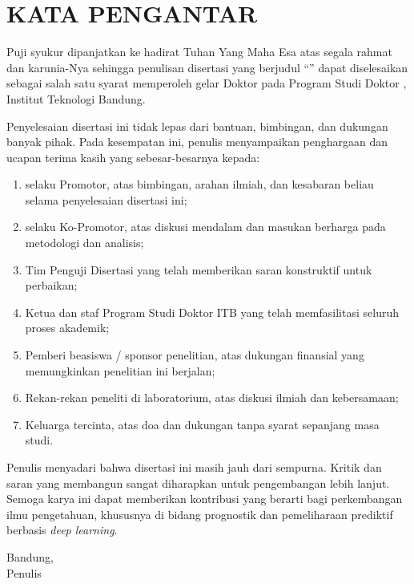 
\chapter*{KATA PENGANTAR}

Puji syukur dipanjatkan ke hadirat Tuhan Yang Maha Esa atas segala
rahmat dan karunia-Nya sehingga penulisan disertasi yang berjudul
``\textbf{\@title}'' dapat diselesaikan sebagai salah satu syarat
memperoleh gelar Doktor pada Program Studi Doktor \@prodi, Institut
Teknologi Bandung.

Penyelesaian disertasi ini tidak lepas dari bantuan, bimbingan, dan
dukungan banyak pihak. Pada kesempatan ini, penulis menyampaikan
penghargaan dan ucapan terima kasih yang sebesar-besarnya kepada:

\begin{enumerate}
  \item \@promotor{} selaku Promotor, atas bimbingan, arahan ilmiah,
        dan kesabaran beliau selama penyelesaian disertasi ini;
  \item \@kopromotor{} selaku Ko-Promotor, atas diskusi mendalam dan
        masukan berharga pada metodologi dan analisis;
  \item Tim Penguji Disertasi yang telah memberikan saran konstruktif
        untuk perbaikan;
  \item Ketua dan staf Program Studi Doktor \@prodi{} ITB yang telah
        memfasilitasi seluruh proses akademik;
  \item Pemberi beasiswa / sponsor penelitian, atas dukungan finansial
        yang memungkinkan penelitian ini berjalan;
  \item Rekan-rekan peneliti di laboratorium, atas diskusi ilmiah dan
        kebersamaan;
  \item Keluarga tercinta, atas doa dan dukungan tanpa syarat sepanjang
        masa studi.
\end{enumerate}

Penulis menyadari bahwa disertasi ini masih jauh dari sempurna. Kritik
dan saran yang membangun sangat diharapkan untuk pengembangan lebih
lanjut. Semoga karya ini dapat memberikan kontribusi yang berarti bagi
perkembangan ilmu pengetahuan, khususnya di bidang prognostik dan
pemeliharaan prediktif berbasis \emph{deep learning}.

\vspace{1cm}
\begin{flushright}
Bandung, \@bulan{} \@tahun\\[0.5cm]
Penulis
\end{flushright}

\cleardoublepage
